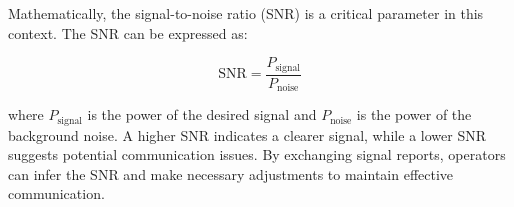 Mathematically, the signal-to-noise ratio (SNR) is a critical parameter in this context. The SNR can be expressed as:

\[
\text{SNR} = \frac{P_{\text{signal}}}{P_{\text{noise}}}
\]

where \( P_{\text{signal}} \) is the power of the desired signal and \( P_{\text{noise}} \) is the power of the background noise. A higher SNR indicates a clearer signal, while a lower SNR suggests potential communication issues. By exchanging signal reports, operators can infer the SNR and make necessary adjustments to maintain effective communication.

